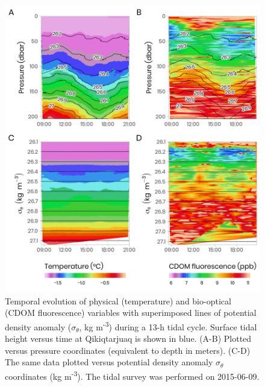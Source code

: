 \documentclass[12pt,a4paper]{scrartcl}
\begin{document}
\begin{figure}[h]
	\centering
	\includegraphics[scale = 1]{../../../graphs/fig04.png}
	\caption{Temporal evolution of physical (temperature) and bio-optical (CDOM fluorescence) variables with superimposed lines of potential density anomaly ($\sigma_\theta$, kg m\textsuperscript{-3}) during a 13-h tidal cycle. Surface tidal height versus time at Qikiqtarjuaq is shown in blue. (A-B) Plotted versus pressure coordinates (equivalent to depth in meters). (C-D) The same data plotted versus potential density anomaly $\sigma_\theta$ coordinates (kg m\textsuperscript{-3}). The tidal survey was performed on 2015-06-09.}
\end{figure}
\end{document}
